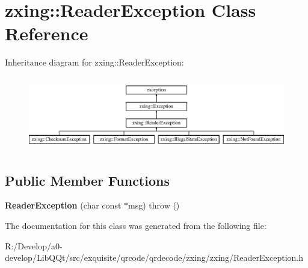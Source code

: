 \hypertarget{classzxing_1_1_reader_exception}{}\section{zxing\+:\+:Reader\+Exception Class Reference}
\label{classzxing_1_1_reader_exception}
Inheritance diagram for zxing\+:\+:Reader\+Exception\+:\begin{figure}[H]
\begin{center}
\leavevmode
\includegraphics[height=3.274854cm]{classzxing_1_1_reader_exception}
\end{center}
\end{figure}
\subsection*{Public Member Functions}
\begin{DoxyCompactItemize}
\item 
\mbox{\label{classzxing_1_1_reader_exception_a92fe3db3dcc5a985bc5904bf78a79c86}} 
{\bfseries Reader\+Exception} (char const $\ast$msg)  throw ()
\end{DoxyCompactItemize}


The documentation for this class was generated from the following file\+:\begin{DoxyCompactItemize}
\item 
R\+:/\+Develop/a0-\/develop/\+Lib\+Q\+Qt/src/exquisite/qrcode/qrdecode/zxing/zxing/Reader\+Exception.\+h\end{DoxyCompactItemize}
